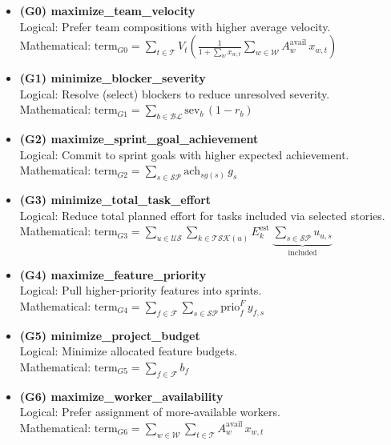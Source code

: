 \documentclass[11pt,a4paper]{article}
\begin{document}
\begin{itemize}[leftmargin=2.2em]

  \item \textbf{(G0) maximize\_team\_velocity} \\
  Logical: Prefer team compositions with higher average velocity. \\
  Mathematical: $\displaystyle \text{term}_{G0}=\sum_{t\in\mathcal{T}} V_t\left(\frac{1}{1+\sum_{w} x_{w,t}}\sum_{w\in\mathcal{W}} A^{\text{avail}}_{w}\,x_{w,t}\right)$
  
  \item \textbf{(G1) minimize\_blocker\_severity} \\
  Logical: Resolve (select) blockers to reduce unresolved severity. \\
  Mathematical: $\displaystyle \text{term}_{G1}=\sum_{b\in\mathcal{BL}} \text{sev}_b\,(1-r_b)$

  \item \textbf{(G2) maximize\_sprint\_goal\_achievement} \\
  Logical: Commit to sprint goals with higher expected achievement. \\
  Mathematical: $\displaystyle \text{term}_{G2}=\sum_{s\in\mathcal{SP}} \text{ach}_{sg(s)}\, g_s$

  \item \textbf{(G3) minimize\_total\_task\_effort} \\
  Logical: Reduce total planned effort for tasks included via selected stories. \\
  Mathematical: $\displaystyle \text{term}_{G3}=\sum_{u\in\mathcal{US}} \sum_{k\in \mathcal{TSK}(u)} E^{\text{est}}_{k}\;\underbrace{\sum_{s\in\mathcal{SP}} u_{u,s}}_{\text{included}}$

  \item \textbf{(G4) maximize\_feature\_priority} \\
  Logical: Pull higher-priority features into sprints. \\
  Mathematical: $\displaystyle \text{term}_{G4}=\sum_{f\in\mathcal{F}}\sum_{s\in\mathcal{SP}} \text{prio}^{F}_{f}\, y_{f,s}$

  \item \textbf{(G5) minimize\_project\_budget} \\
  Logical: Minimize allocated feature budgets. \\
  Mathematical: $\displaystyle \text{term}_{G5}=\sum_{f\in\mathcal{F}} b_f$

  \item \textbf{(G6) maximize\_worker\_availability} \\
  Logical: Prefer assignment of more-available workers. \\
  Mathematical: $\displaystyle \text{term}_{G6}=\sum_{w\in\mathcal{W}} \sum_{t\in\mathcal{T}} A^{\text{avail}}_{w}\,x_{w,t}$


\end{itemize}
\end{document}
